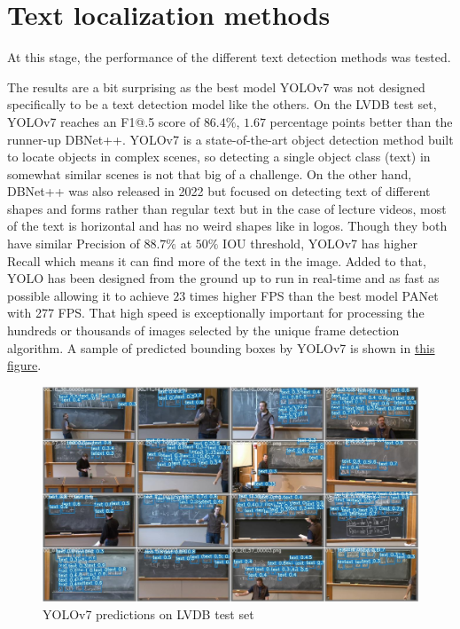 \section{Text localization methods}

At this stage, the performance of the different text detection methods was tested.



The results are a bit surprising as the best model YOLOv7 was not designed specifically to be a text detection model like the others. On the LVDB test set, YOLOv7 reaches an F1@.5 score of $86.4\%$, $1.67$ percentage points better than the runner-up DBNet++. YOLOv7 is a state-of-the-art object detection method built to locate objects in complex scenes, so detecting a single object class (text) in somewhat similar scenes is not that big of a challenge. On the other hand, DBNet++ was also released in 2022 but focused on detecting text of different shapes and forms rather than regular text but in the case of lecture videos, most of the text is horizontal and has no weird shapes like in logos. Though they both have similar Precision of $88.7\%$ at $50\%$ IOU threshold, YOLOv7 has higher Recall which means it can find more of the text in the image. Added to that, YOLO has been designed from the ground up to run in real-time and as fast as possible allowing it to achieve $23$ times higher FPS than the best model PANet with 277 FPS. That high speed is exceptionally important for processing the hundreds or thousands of images selected by the unique frame detection algorithm.
A sample of predicted bounding boxes by YOLOv7 is shown in \hyperref[exp:yolo_pred]{this figure}.

\begin{figure}[H]
        \centering
        \includegraphics[width=140mm]{figures/test_batch0_pred.jpg}
        \caption{YOLOv7 predictions on LVDB test set}
        \label{exp:yolo_pred}
\end{figure}

